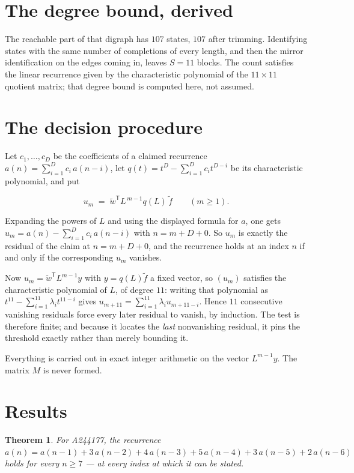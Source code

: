 \documentclass[11pt]{article}
\newtheorem{theorem}{Theorem}
\theoremstyle{definition}
\begin{document}
\section{The degree bound, derived}

The reachable part of that digraph has $107$ states, $107$ after trimming. Identifying states with the same number of completions of every length, and then the mirror identification on the edges coming in, leaves $S = 11$ blocks. The count satisfies the linear recurrence given by the characteristic polynomial of the $11\times11$ quotient matrix; that degree bound is computed here, not assumed.

\section{The decision procedure}

Let $c_1,\dots,c_D$ be the coefficients of a claimed recurrence $a(n) = \sum_{i=1}^{D} c_i\,a(n-i)$, let $q(t) = t^{D} - \sum_{i=1}^{D} c_i t^{D-i}$ be its characteristic polynomial, and put

\[u_m \;=\; \tilde w^{\mathsf T} L^{\,m-1} q(L)\,\tilde f \qquad (m \ge 1).\]

Expanding the powers of $L$ and using the displayed formula for $a$, one gets $u_m = a(n) - \sum_{i=1}^{D} c_i\,a(n-i)$ with $n = m + D + 0$. So $u_m$ is exactly the residual of the claim at $n = m + D + 0$, and the recurrence holds at an index $n$ if and only if the corresponding $u_m$ vanishes.

Now $u_m = \tilde w^{\mathsf T} L^{m-1} y$ with $y = q(L)\tilde f$ a fixed vector, so $(u_m)$ satisfies the characteristic polynomial of $L$, of degree $11$: writing that polynomial as $t^{11} - \sum_{i=1}^{11} \lambda_i t^{11-i}$ gives $u_{m+11} = \sum_{i=1}^{11} \lambda_i u_{m+11-i}$. Hence $11$ consecutive vanishing residuals force every later residual to vanish, by induction. The test is therefore finite; and because it locates the {\itshape last} nonvanishing residual, it pins the threshold exactly rather than merely bounding it.

Everything is carried out in exact integer arithmetic on the vector $L^{m-1}y$. The matrix $M$ is never formed.

\section{Results}

\begin{theorem} For A244177, the recurrence $a(n) = a(n-1) + 3\,a(n-2) + 4\,a(n-3) + 5\,a(n-4) + 3\,a(n-5) + 2\,a(n-6)$ holds for every $n \ge 7$ --- at every index at which it can be stated.\end{theorem}
\end{document}
